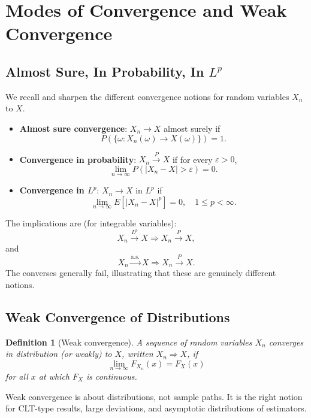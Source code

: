 \documentclass[11pt,a4paper]{article}
\newtheorem{definition}{Definition}[section]
\numberwithin{equation}{section}
\begin{document}
\section{Modes of Convergence and Weak Convergence}
\label{sec:weak-conv}

\subsection{Almost Sure, In Probability, In $L^p$}

We recall and sharpen the different convergence notions for random variables $X_n$ to $X$.

\begin{itemize}
    \item \textbf{Almost sure convergence}: $X_n \to X$ almost surely if
    \[
      P(\{\omega : X_n(\omega)\to X(\omega)\}) = 1.
    \]
    \item \textbf{Convergence in probability}: $X_n \xrightarrow{P} X$ if for every $\varepsilon>0$,
    \[
      \lim_{n\to\infty} P(|X_n - X| > \varepsilon) = 0.
    \]
    \item \textbf{Convergence in $L^p$}: $X_n \to X$ in $L^p$ if
    \[
      \lim_{n\to\infty} E[|X_n - X|^p] = 0,\quad 1 \le p < \infty.
    \]
\end{itemize}

The implications are (for integrable variables):
\[
X_n \xrightarrow{L^p} X \Longrightarrow X_n \xrightarrow{P} X,
\]
and
\[
X_n \xrightarrow{\text{a.s.}} X \Longrightarrow X_n \xrightarrow{P} X.
\]
The converses generally fail, illustrating that these are genuinely different notions.

\subsection{Weak Convergence of Distributions}

\begin{definition}[Weak convergence]
A sequence of random variables $X_n$ converges in distribution (or weakly) to $X$, written $X_n \Rightarrow X$, if
\[
\lim_{n\to\infty} F_{X_n}(x) = F_X(x)
\]
for all $x$ at which $F_X$ is continuous.
\end{definition}

Weak convergence is about distributions, not sample paths. 
It is the right notion for CLT-type results, large deviations, and asymptotic distributions of estimators.
\end{document}

